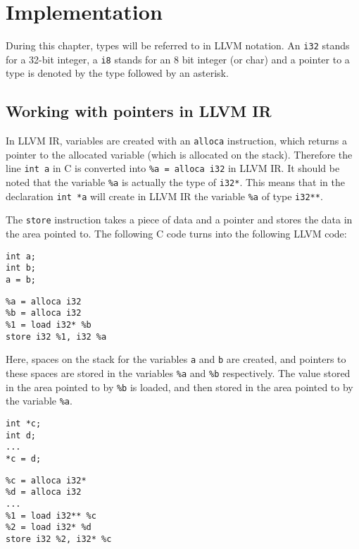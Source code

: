 \chapter{Implementation}

During this chapter, types will be referred to in LLVM notation.
An \verb!i32! stands for a 32-bit integer, a \verb!i8! stands for an 8 bit integer (or char) and a pointer to a type is denoted by the type followed by an asterisk.

\section{Working with pointers in LLVM IR}

In LLVM IR, variables are created with an \verb!alloca! instruction, which returns a pointer to the allocated variable (which is allocated on the stack).
Therefore the line \verb!int a! in C is converted into \verb!%a = alloca i32! in LLVM IR.
It should be noted that the variable \verb!%a! is actually the type of \verb!i32*!.
This means that in the declaration \verb!int *a! will create in LLVM IR the variable \verb!%a! of type \verb!i32**!.

The \verb!store! instruction takes a piece of data and a pointer and stores the data in the area pointed to.
The following C code turns into the following LLVM code:

\begin{verbatim}
int a;
int b;
a = b;
\end{verbatim}

\begin{verbatim}
%a = alloca i32
%b = alloca i32
%1 = load i32* %b
store i32 %1, i32 %a
\end{verbatim}

Here, spaces on the stack for the variables \verb!a! and \verb!b! are created, and pointers to these spaces are stored in the variables \verb!%a! and \verb!%b! respectively.
The value stored in the area pointed to by \verb!%b! is loaded, and then stored in the area pointed to by the variable \verb!%a!.

\begin{verbatim}
int *c;
int d;
...
*c = d;
\end{verbatim}

\begin{verbatim}
%c = alloca i32*
%d = alloca i32
...
%1 = load i32** %c
%2 = load i32* %d
store i32 %2, i32* %c
\end{verbatim}

